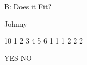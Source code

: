 \begin{problem}{B: Does it Fit?}

Johnny

\end{problem}

\begin{formalin}

\end{formalin}

\begin{formalout}

\end{formalout}

\begin{datain}
10
1 2 3 4 5 6
1 1 1 2 2 2
\end{datain}

\begin{dataout}
YES
NO
\end{dataout}

